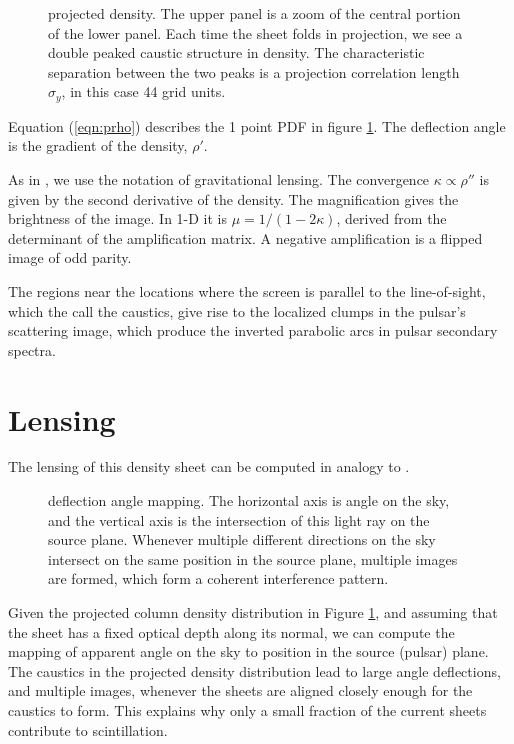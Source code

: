 \documentclass[useAMS,usenatbib]{mn2e}
\begin{document}
\begin{figure}
\centerline{}
\caption{projected density.  The upper panel is a zoom of the central
  portion of the lower panel. Each time the sheet folds in projection,
we see a double peaked caustic structure in density.  The
characteristic separation
between the two peaks is a projection correlation length $\sigma_y$,
in this case 44 grid units.}
\label{fig:rho}
\end{figure}

Equation (\ref{eqn:prho}) describes the 1 point PDF in figure
\ref{fig:rho}.  The deflection angle is the gradient of the density, $\rho'$.

As in \cite{2012MNRAS.421L.132P}, we use the notation of gravitational
lensing.  The convergence $\kappa \propto \rho''$ is given by the
second derivative of the density.  The magnification gives the
brightness of the image.  In 1-D it is $\mu=1/(1-2\kappa)$, derived
from the determinant of the amplification matrix.  A negative
amplification is a flipped image of odd parity.

The regions near the locations where the screen is parallel to the
line-of-sight, which the call the caustics, give rise to the localized
clumps in the pulsar's scattering image, which produce the inverted
parabolic arcs in pulsar secondary spectra.

\section{Lensing}

The lensing of this density sheet can be computed in analogy to 
 \cite{2012MNRAS.421L.132P}.

\begin{figure}
\centerline{}
\caption{deflection angle mapping. The horizontal axis is angle on the
sky, and the vertical axis is the intersection of this light ray on
the source plane.  Whenever multiple different directions on the sky
intersect on the same position in the source plane, multiple images
are formed, which form a coherent interference pattern.}
\label{fig:dt}
\end{figure}

Given the projected column density distribution in Figure \ref{fig:rho}, and assuming that
the sheet has a fixed optical depth along its normal, we
can compute the mapping of apparent angle on the sky to position in the
source (pulsar) plane.  The caustics in the projected density
distribution lead to large angle deflections, and multiple images,
whenever the sheets are aligned closely enough for the caustics to form.
This explains why only a small fraction of the current
sheets contribute to scintillation. 
\end{document}
